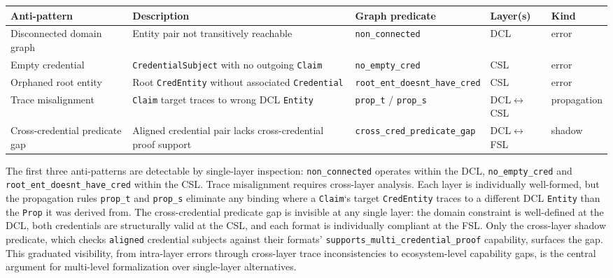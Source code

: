 \begin{center}
\begin{tabular}{lllll}
\toprule
Anti-pattern & Description & Graph predicate & Layer(s) & Kind \\
\midrule
Disconnected domain graph & Entity pair not transitively reachable & \texttt{non\_connected} & DCL & error \\
Empty credential & \texttt{CredentialSubject} with no outgoing \texttt{Claim} & \texttt{no\_empty\_cred} & CSL & error \\
Orphaned root entity & Root \texttt{CredEntity} without associated \texttt{Credential} & \texttt{root\_ent\_doesnt\_have\_cred} & CSL & error \\
Trace misalignment & \texttt{Claim} target traces to wrong DCL \texttt{Entity} & \texttt{prop\_t} / \texttt{prop\_s} & DCL\(\leftrightarrow\)CSL & propagation \\
Cross-credential predicate gap & Aligned credential pair lacks cross-credential proof support & \texttt{cross\_cred\_predicate\_gap} & DCL\(\leftrightarrow\)FSL & shadow \\
\bottomrule
\end{tabular}
\end{center}

\label{tab:antipatterns}


The first three anti-patterns are detectable by single-layer inspection: \texttt{non\_connected} operates within the DCL, \texttt{no\_empty\_cred} and \texttt{root\_ent\_doesnt\_have\_cred} within the CSL. Trace misalignment requires cross-layer analysis. Each layer is individually well-formed, but the propagation rules \texttt{prop\_t} and \texttt{prop\_s} eliminate any binding where a \texttt{Claim}`s target \texttt{CredEntity} traces to a different DCL \texttt{Entity} than the \texttt{Prop} it was derived from. The cross-credential predicate gap is invisible at any single layer: the domain constraint is well-defined at the DCL, both credentials are structurally valid at the CSL, and each format is individually compliant at the FSL. Only the cross-layer shadow predicate, which checks \texttt{aligned} credential subjects against their formats' \texttt{supports\_multi\_credential\_proof} capability, surfaces the gap. This graduated visibility, from intra-layer errors through cross-layer trace inconsistencies to ecosystem-level capability gaps, is the central argument for multi-level formalization over single-layer alternatives.

